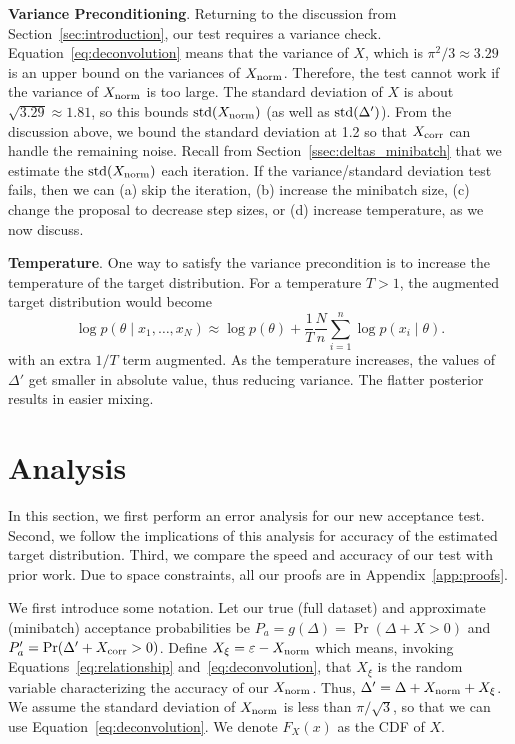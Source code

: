 \documentclass{article}
\begin{document}
\textbf{Variance Preconditioning}. Returning to the discussion from Section~\ref{sec:introduction},
our test requires a variance check. Equation~\ref{eq:deconvolution} means that the variance of $X$,
which is $\pi^2/3\approx 3.29$ is an upper bound on the variances of $X_{\rm norm}$. Therefore, the
test cannot work if the variance of $X_{\rm norm}$ is too large. The standard deviation of $X$
is about $\sqrt{3.29}\approx 1.81$, so this bounds ${\rm std}(X_{\rm norm})$ (as well as ${\rm
std}(\Delta')$). From the discussion above, we bound the standard deviation at 1.2 so that $X_{\rm
corr}$ can handle the remaining noise. Recall from Section~\ref{ssec:deltas_minibatch} that we
estimate the ${\rm std}(X_{\rm norm})$ each iteration. If the variance/standard deviation test
fails, then we can (a) skip the iteration, (b) increase the minibatch size, (c) change the proposal
to decrease step sizes, or (d) increase temperature, as we now discuss.

\textbf{Temperature}. One way to satisfy the variance precondition is to increase the temperature of
the target distribution. For a temperature $T>1$, the augmented target distribution would become
\begin{equation}\label{eq:log_temperature}
\log p(\theta \mid x_1,\ldots,x_N) \approx \log p(\theta) + \frac{1}{T}\frac{N}{n} \sum_{i=1}^n\log p(x_i \mid \theta).
\end{equation}
with an extra $1/T$ term augmented. As the temperature increases, the values of $\Delta'$ get
smaller in absolute value, thus reducing variance. The flatter posterior results in easier mixing.




\section{Analysis}\label{sec:theory}

In this section, we first perform an error analysis for our new
acceptance test. Second, we follow the implications of this analysis for accuracy of
the estimated target distribution. Third, we compare the speed and accuracy of
our test with prior work. Due to space constraints, all our proofs
are in Appendix~\ref{app:proofs}.

We first introduce some notation. Let our true (full dataset) and
approximate (minibatch) acceptance probabilities be $P_a = g(\Delta) =
\Pr(\Delta + X > 0)$ and $P_a' = \Pr(\Delta' + X_{\rm corr} > 0)$.
Define $X_{\xi} = \varepsilon - X_{\rm norm}$ which means, invoking
Equations~\ref{eq:relationship} and~\ref{eq:deconvolution}, that
$X_\xi$ is the random variable characterizing the accuracy of our
$X_{\rm norm}$.  Thus, $\Delta' = \Delta + X_{\rm norm} + X_\xi$. We
assume the standard deviation of $X_{\rm norm}$ is less than
$\pi/\sqrt{3}$, so that we can use Equation~\ref{eq:deconvolution}.
We denote $F_X(x)$ as the CDF of $X$.
\end{document}
